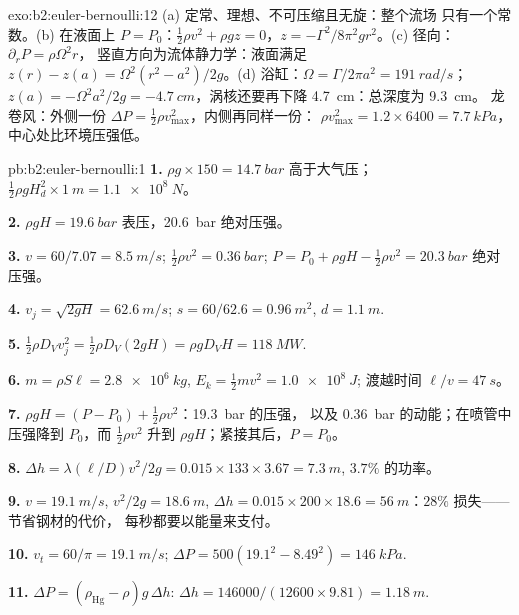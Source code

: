 \begin{solution}{exo:b2:euler-bernoulli:12}
(a) 定常、理想、不可压缩且无旋：整个流场
只有一个常数。(b) 在液面上 $P = P_0$：$\tfrac12\rho v^2 + \rho gz =
0$，$z = -\Gamma^2/8\pi^2gr^2$。(c) 径向：$\partial_rP = \rho\Omega^2r$，
竖直方向为流体静力学：液面满足 $z(r) - z(a) = \Omega^2(r^2 -
a^2)/2g$。(d) 浴缸：$\Omega = \Gamma/2\pi a^2 = \qty{191}{rad/s}$；$z(a) = -\Omega^2a^2/
2g = \qty{-4.7}{cm}$，涡核还要再下降 \qty{4.7}{cm}：总深度为 \qty{9.3}{cm}。
龙卷风：外侧一份 $\Delta P = \tfrac12\rho v_{\max}^2$，内侧再同样一份：
$\rho v_{\max}^2 = 1.2 \times 6400 = \qty{7.7}{kPa}$，中心处比环境压强低。
\end{solution}

\begin{solution}{pb:b2:euler-bernoulli:1}
\textbf{1.} $\rho g \times 150 = \qty{14.7}{bar}$ 高于大气压；$\tfrac12\rho gH_d^2
\times \qty{1}{m} = \qty{1.1e8}{N}$。

\textbf{2.} $\rho gH = \qty{19.6}{bar}$ 表压，\qty{20.6}{bar} 绝对压强。

\textbf{3.} $v = 60/7.07 = \qty{8.5}{m/s}$; $\tfrac12\rho v^2 = \qty{0.36}{bar}$; $P =
P_0 + \rho gH - \tfrac12\rho v^2 = \qty{20.3}{bar}$ 绝对压强。

\textbf{4.} $v_j = \sqrt{2gH} = \qty{62.6}{m/s}$; $s = 60/62.6 = \qty{0.96}{m^2}$, $d =
\qty{1.1}{m}$.

\textbf{5.} $\tfrac12\rho D_Vv_j^2 = \tfrac12\rho D_V(2gH) = \rho gD_VH = \qty{118}{MW}$.

\textbf{6.} $m = \rho S\ell = \qty{2.8e6}{kg}$, $E_k = \tfrac12mv^2 = \qty{1.0e8}{J}$;
渡越时间 $\ell/v = \qty{47}{s}$。

\textbf{7.} $\rho gH = (P - P_0) + \tfrac12\rho v^2$：\qty{19.3}{bar} 的压强，
以及 \qty{0.36}{bar} 的动能；在喷管中压强降到
$P_0$，而 $\tfrac12\rho v^2$ 升到 $\rho gH$；紧接其后，$P = P_0$。

\textbf{8.} $\Delta h = \lambda(\ell/D)v^2/2g = 0.015 \times 133 \times 3.67 = \qty{7.3}{m}$,
$3.7\%$ 的功率。

\textbf{9.} $v = \qty{19.1}{m/s}$, $v^2/2g = \qty{18.6}{m}$, $\Delta h = 0.015 \times 200 \times
18.6 = \qty{56}{m}$：$28\%$ 损失——节省钢材的代价，
每秒都要以能量来支付。

\textbf{10.} $v_t = 60/\pi = \qty{19.1}{m/s}$; $\Delta P = 500(19.1^2 - 8.49^2) =
\qty{146}{kPa}$.

\textbf{11.} $\Delta P = (\rho_{\text{Hg}} - \rho)g\,\Delta h$: $\Delta h = 146000/(12600
\times 9.81) = \qty{1.18}{m}$.


\end{solution}
